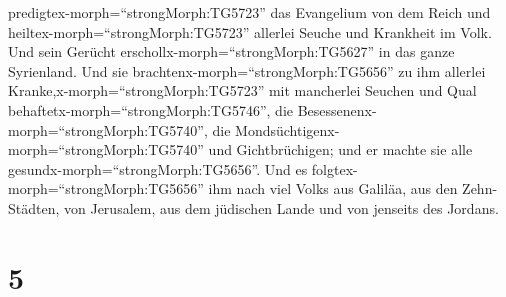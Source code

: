 predigtex-morph=``strongMorph:TG5723'' das Evangelium von dem Reich und
heiltex-morph=``strongMorph:TG5723'' allerlei Seuche und Krankheit im
Volk.  Und sein Gerücht
erschollx-morph=``strongMorph:TG5627'' in das ganze Syrienland. Und sie
brachtenx-morph=``strongMorph:TG5656'' zu ihm allerlei
Kranke,x-morph=``strongMorph:TG5723'' mit mancherlei Seuchen und Qual
behaftetx-morph=``strongMorph:TG5746'', die
Besessenenx-morph=``strongMorph:TG5740'', die
Mondsüchtigenx-morph=``strongMorph:TG5740'' und Gichtbrüchigen; und er
machte sie alle gesundx-morph=``strongMorph:TG5656''.  Und
es folgtex-morph=``strongMorph:TG5656'' ihm nach viel Volks aus Galiläa,
aus den Zehn-Städten, von Jerusalem, aus dem jüdischen Lande und von
jenseits des Jordans.

\hypertarget{section-4}{%
\section{5}\label{section-4}}

